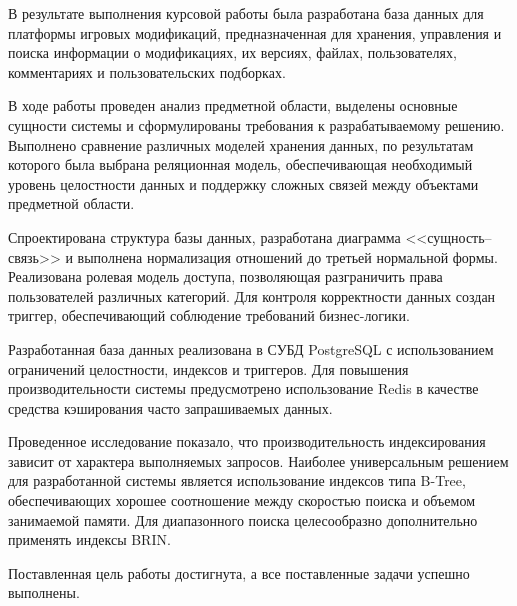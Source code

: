 
В результате выполнения курсовой работы была разработана база данных для платформы игровых модификаций, предназначенная для хранения, управления и поиска информации о модификациях, их версиях, файлах, пользователях, комментариях и пользовательских подборках.

В ходе работы проведен анализ предметной области, выделены основные сущности системы и сформулированы требования к разрабатываемому решению. Выполнено сравнение различных моделей хранения данных, по результатам которого была выбрана реляционная модель, обеспечивающая необходимый уровень целостности данных и поддержку сложных связей между объектами предметной области.

Спроектирована структура базы данных, разработана диаграмма \newline<<сущность--связь>> и выполнена нормализация отношений до третьей нормальной формы. Реализована ролевая модель доступа, позволяющая разграничить права пользователей различных категорий. Для контроля корректности данных создан триггер, обеспечивающий соблюдение требований бизнес-логики.

Разработанная база данных реализована в СУБД PostgreSQL с использованием ограничений целостности, индексов и триггеров. Для повышения производительности системы предусмотрено использование Redis в качестве средства кэширования часто запрашиваемых данных.

Проведенное исследование показало, что производительность индексирования зависит от характера выполняемых запросов. Наиболее универсальным решением для разработанной системы является использование индексов типа B-Tree, обеспечивающих хорошее соотношение между скоростью поиска и объемом занимаемой памяти. Для диапазонного поиска целесообразно дополнительно применять индексы BRIN.

Поставленная цель работы достигнута, а все поставленные задачи успешно выполнены.